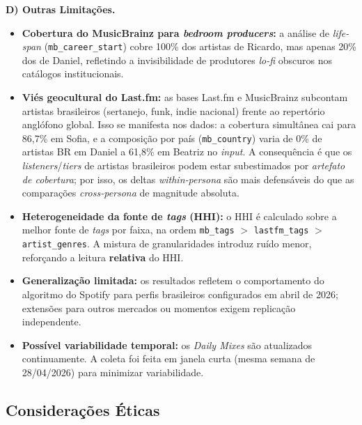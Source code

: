 \documentclass[12pt, %
openright,
oneside, %
a4paper,    %
english,   %
brazil]{facom-ufu-abntex2}
\begin{document}
\textbf{D) Outras Limitações.}
\begin{itemize}
  \item \textbf{Cobertura do MusicBrainz para \emph{bedroom producers}:} a
  análise de \emph{life-span} (\texttt{mb\_career\_start}) cobre 100\% dos
  artistas de Ricardo, mas apenas 20\% dos de Daniel, refletindo a invisibilidade
  de produtores \emph{lo-fi} obscuros nos catálogos institucionais.
  \item \textbf{Viés geocultural do Last.fm:} as bases Last.fm e MusicBrainz
  subcontam artistas brasileiros (sertanejo, funk, indie nacional) frente ao
  repertório anglófono global. Isso se manifesta nos dados: a cobertura
  simultânea cai para 86,7\% em Sofia, e a composição por país
  (\texttt{mb\_country}) varia de 0\% de artistas BR em Daniel a 61,8\% em Beatriz
  no \emph{input}. A consequência é que os \emph{listeners}/\emph{tiers} de
  artistas brasileiros podem estar subestimados por \emph{artefato de cobertura};
  por isso, os deltas \emph{within-persona} são mais defensáveis do que as
  comparações \emph{cross-persona} de magnitude absoluta.
  \item \textbf{Heterogeneidade da fonte de \emph{tags} (HHI):} o HHI é calculado
  sobre a melhor fonte de \emph{tags} por faixa, na ordem \texttt{mb\_tags} $>$
  \texttt{lastfm\_tags} $>$ \texttt{artist\_genres}. A mistura de granularidades
  introduz ruído menor, reforçando a leitura \textbf{relativa} do HHI.
  \item \textbf{Generalização limitada:} os resultados refletem o comportamento
  do algoritmo do Spotify para perfis brasileiros configurados em abril de 2026;
  extensões para outros mercados ou momentos exigem replicação independente.
  \item \textbf{Possível variabilidade temporal:} os \emph{Daily Mixes} são
  atualizados continuamente. A coleta foi feita em janela curta (mesma semana de
  28/04/2026) para minimizar variabilidade.
\end{itemize}

\subsection{Considerações Éticas}
\end{document}
